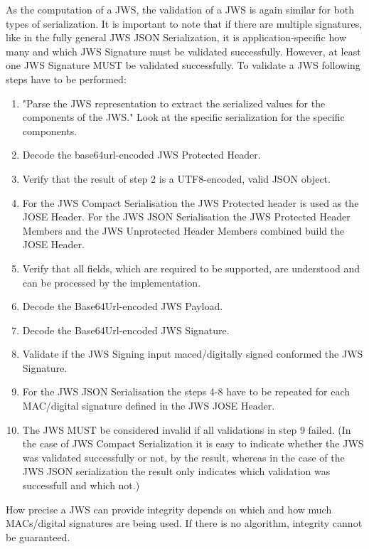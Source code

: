 As the computation of a JWS, the validation of a JWS is again similar for both types of serialization. It is important to note that if there are multiple signatures, like in the fully general JWS JSON Serialization,  it is application-specific how many and which JWS Signature must be validated successfully.\cite{rfc7515} However, at least one JWS Signature MUST be validated successfully.
To validate a JWS following steps have to be performed:\newline  
\begin{enumerate}
\item "Parse the JWS representation to extract the serialized values for the components of the JWS."\cite{rfc7515} Look at the specific serialization for the specific components.
\item Decode the base64url-encoded JWS Protected Header.
\item Verify that the result of step 2 is a UTF8-encoded, valid JSON object.
\item For the JWS Compact Serialisation the JWS Protected header is used as the JOSE Header. For the JWS JSON Serialisation the JWS Protected Header Members and the JWS Unprotected Header Members combined build the JOSE Header.
\item Verify that all fields, which are required to be supported, are understood and can be processed by the implementation.

\item Decode the Base64Url-encoded JWS Payload.
\item Decode the Base64Url-encoded JWS Signature.
\item Validate if the JWS Signing input maced/digitally signed conformed the JWS Signature.
\item For the JWS JSON Serialisation the steps 4-8 have to be repeated for each MAC/digital signature defined in the JWS JOSE Header.
\item The JWS MUST be considered invalid if all validations in step 9 failed. (In the case of JWS Compact Serialization it is easy to indicate whether the JWS was validated successfully or not, by the result, whereas in the case of the JWS JSON serialization the result only indicates which validation was successfull and which not.)
\end{enumerate}
How precise a JWS can provide integrity depends on which and how much MACs/digital signatures are being used. If there is no algorithm, integrity cannot be guaranteed. 